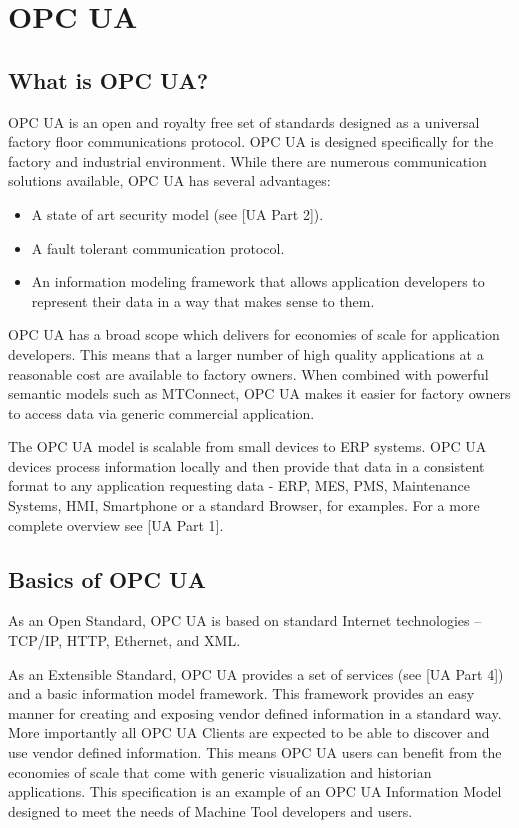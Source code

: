 \section{OPC UA}

\subsection{What is OPC UA?}

OPC UA is an open and royalty free set of standards designed as a universal factory floor communications protocol.
OPC UA is designed specifically for the factory and industrial environment. While there are numerous communication solutions available, OPC UA has several advantages:

\begin{itemize}
\item A state of art security model (see [UA Part 2]).
\item A fault tolerant communication protocol.
\item An information modeling framework that allows application developers to represent their data in a way that makes sense to them.
\end{itemize}

OPC UA has a broad scope which delivers for economies of scale for application developers. This means that a larger number of high quality applications at a reasonable cost are available to factory owners. When combined with powerful semantic models such as MTConnect, OPC UA makes it easier for factory owners to access data via generic commercial application.

The OPC UA model is scalable from small devices to ERP systems. OPC UA devices process information locally and then provide that data in a consistent format to any application requesting data - ERP, MES, PMS, Maintenance Systems, HMI, Smartphone or a standard Browser, for examples. For a more complete overview see [UA Part 1].

\subsection{Basics of OPC UA}

As an Open Standard, OPC UA is based on standard Internet technologies – TCP/IP, HTTP, Ethernet, and XML.

As an Extensible Standard, OPC UA provides a set of services (see [UA Part 4]) and a basic information model framework. This framework provides an easy manner for creating and exposing vendor defined information in a standard way. More importantly all OPC UA Clients are expected to be able to discover and use vendor defined information. This means OPC UA users can benefit from the economies of scale that come with generic visualization and historian applications. This specification is an example of an OPC UA Information Model designed to meet the needs of Machine Tool developers and users.

